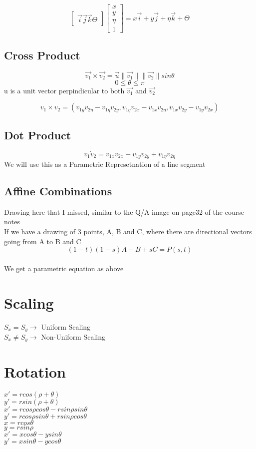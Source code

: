 \documentclass[12pt]{article}
\begin{document}
	$$\begin{bmatrix} \overrightarrow{i} \overrightarrow{j} \overrightarrow{k} \Theta \end{bmatrix} \begin{bmatrix} x \\ y \\ \eta \\ 1 \end{bmatrix} = x\overrightarrow{i} + y\overrightarrow{j} + \eta\overrightarrow{k} + \Theta$$
	
	\subsection*{Cross Product}
	$$\overrightarrow{v_1} \times \overrightarrow{v_2} = \overrightarrow{u}\|\overrightarrow{v_1}\|\|\overrightarrow{v_2}\|sin{\theta}$$
	$$0 \le \theta \le \pi$$
	u is a unit vector perpindicular to both $\overrightarrow{v_1}$ and $\overrightarrow{v_2}$
	
	$$v_1 \times v_2 = (v_{1y}v_{2\eta} - v_{1\eta}v_{2y}, v_{1\eta}v_{2x} - v_{1x}v_{2\eta}, v_{1x}v_{2y} - v_{1y}v_{2x})$$
	
	\subsection*{Dot Product}
	$$v_1 \dot v_2 = v_{1x}v_{2x} + v_{1y}v_{2y} + v_{1\eta}v_{2\eta}$$
	We will use this as a Parametric Represetnation of a line segment\\
	
	
	\subsection*{Affine Combinations}
	Drawing here that I missed, similar to the Q/A image on page32 of the course notes\\
	
	If we have a drawing of 3 points, A, B and C, where there are directional vectors going from A to B and C\\
	$$(1-t)(1-s)A + B + sC = P(s,t)$$\\
	We get a parametric equation as above\\
	
	\section*{Scaling}
	$S_x = S_y \rightarrow$ Uniform Scaling\\
	$S_x \ne S_y \rightarrow$ Non-Uniform Scaling\\
	
	\section*{Rotation}
	$x' = rcos(\rho + \theta)$\\
	$y' = rsin(\rho + \theta)$\\
	$x' = rcos\rho cos\theta - rsin\rho sin\theta$\\
	$y' = rcos\rho sin\theta + rsin\rho cos\theta$\\
	$x = rcos\theta$\\
	$y = rsin\rho$\\
	$x' = xcos\theta - ysin\theta$\\
	$y' = xsin\theta - ycos\theta$\\
\end{document}
